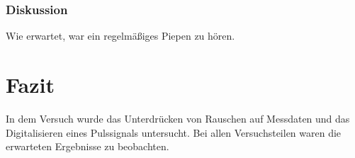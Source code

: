 \documentclass[12pt,a4paper]{article}
\begin{document}
\subsubsection*{Diskussion}

Wie erwartet, war ein regelmäßiges Piepen zu hören.

\section{Fazit}

In dem Versuch wurde das Unterdrücken von Rauschen auf  Messdaten und das Digitalisieren eines Pulssignals untersucht. Bei allen Versuchsteilen waren die erwarteten Ergebnisse zu beobachten.
\end{document}
